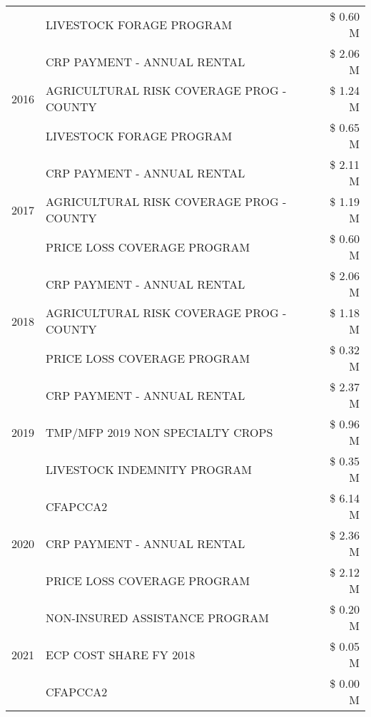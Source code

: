 \begin{tabular}{llr}
 & LIVESTOCK FORAGE PROGRAM & \$ 0.60 M \\
\cline{1-3}
\multirow[t]{3}{*}{2016} & CRP PAYMENT - ANNUAL RENTAL & \$ 2.06 M \\
 & AGRICULTURAL RISK COVERAGE PROG - COUNTY & \$ 1.24 M \\
 & LIVESTOCK FORAGE PROGRAM & \$ 0.65 M \\
\cline{1-3}
\multirow[t]{3}{*}{2017} & CRP PAYMENT - ANNUAL RENTAL & \$ 2.11 M \\
 & AGRICULTURAL RISK COVERAGE PROG - COUNTY & \$ 1.19 M \\
 & PRICE LOSS COVERAGE PROGRAM & \$ 0.60 M \\
\cline{1-3}
\multirow[t]{3}{*}{2018} & CRP PAYMENT - ANNUAL RENTAL & \$ 2.06 M \\
 & AGRICULTURAL RISK COVERAGE PROG - COUNTY & \$ 1.18 M \\
 & PRICE LOSS COVERAGE PROGRAM & \$ 0.32 M \\
\cline{1-3}
\multirow[t]{3}{*}{2019} & CRP PAYMENT - ANNUAL RENTAL & \$ 2.37 M \\
 & TMP/MFP 2019 NON SPECIALTY CROPS & \$ 0.96 M \\
 & LIVESTOCK INDEMNITY PROGRAM & \$ 0.35 M \\
\cline{1-3}
\multirow[t]{3}{*}{2020} & CFAPCCA2 & \$ 6.14 M \\
 & CRP PAYMENT - ANNUAL RENTAL & \$ 2.36 M \\
 & PRICE LOSS COVERAGE PROGRAM & \$ 2.12 M \\
\cline{1-3}
\multirow[t]{3}{*}{2021} & NON-INSURED ASSISTANCE PROGRAM & \$ 0.20 M \\
 & ECP COST SHARE FY 2018 & \$ 0.05 M \\
 & CFAPCCA2 & \$ 0.00 M \\
\cline{1-3}
\bottomrule
\end{tabular}
